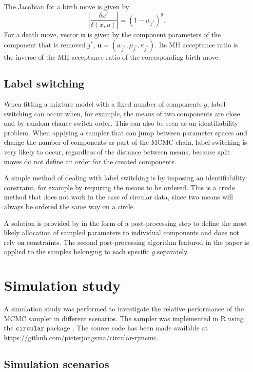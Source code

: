 The Jacobian for a birth move is given by
\begin{equation}
\left| \frac{\delta x'}{\delta (x, u)} \right| = (1-w_{j^*})^g.
\end{equation}
For a death move, vector $\bm u$ is given by the component parameters of the component that is removed $j^*$, $\bm u = (w_{j^*}, \mu_{j^*}, \kappa_{j^*})$. Its MH acceptance ratio is the inverse of the MH acceptance ratio of the corresponding birth move.


\subsection{Label switching}
When fitting a mixture model with a fixed number of components $g$, label switching \citep{Jasra:2005ho} can occur when, for example, the means of two components are close and by random chance switch order. This can also be seen as an identifiability problem.
When applying a sampler that can jump between parameter spaces and change the number of components as part of the MCMC chain, label switching is very likely to occur, regardless of the distance between means, because split moves do not define an order for the created components.

A simple method of dealing with label switching is by imposing an identifiability constraint, for example by requiring the means to be ordered. This is a crude method that does not work in the case of circular data, since two means will always be ordered the same way on a circle.

A solution is provided by \citet{Stephens:2000gba} in the form of a post-processing step to define the most likely allocation of sampled parameters to individual components and does not rely on constraints. The second post-processing algorithm featured in the paper is applied to the samples belonging to each specific $g$ separately.

\section{Simulation study}
\label{simulations}

A simulation study was performed to investigate the relative performance of the MCMC sampler in different scenarios. The sampler was implemented in R \citep{rlanguage} using the $\texttt{circular}$ package \citep{rcircular}. The source code has been made available at \url{https://github.com/pieterjongsma/circular-rjmcmc}.

\subsection{Simulation scenarios}

